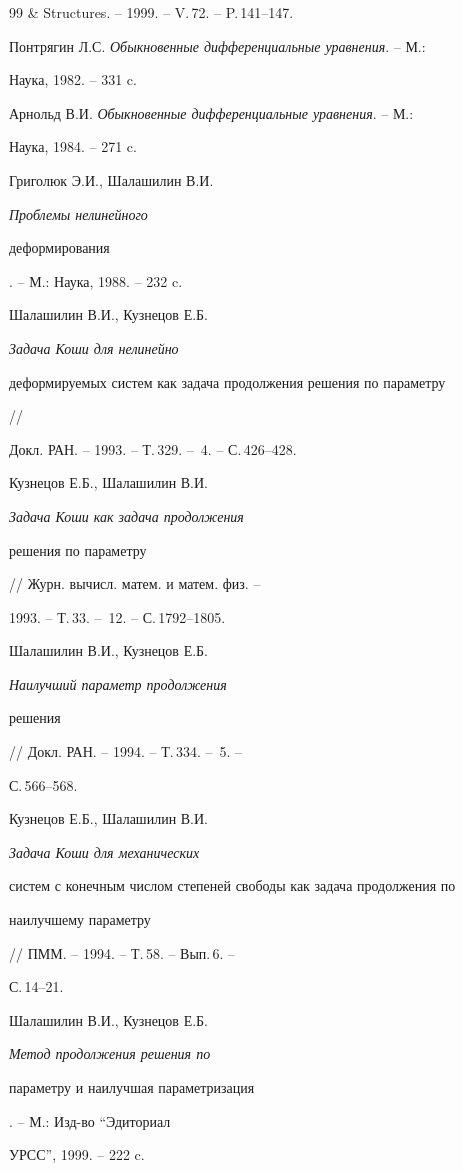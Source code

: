 \begin{thebibliography}{99}
\& Structures. -- 1999. -- V.\,72. -- P.\,141--147. 




Понтрягин Л.С. {\em Обыкновенные дифференциальные уравнения}. -- М.: 


Наука, 1982. -- 331 c. 




Арнольд В.И. {\em Обыкновенные дифференциальные уравнения}. -- М.: 


Наука, 1984. -- 271 c. 




Григолюк Э.И., Шалашилин В.И. {\em Проблемы нелинейного 


деформирования}. -- М.: Наука, 1988. -- 232 c. 




Шалашилин В.И., Кузнецов Е.Б. {\em Задача Коши для нелинейно 


деформируемых систем как задача продолжения решения по параметру} // 


Докл. РАН. -- 1993. -- Т.\,329. -- \No\,4. -- С.\,426--428. 




Кузнецов Е.Б., Шалашилин В.И. {\em Задача Коши как задача продолжения 


решения по параметру} // Журн. вычисл. матем. и матем. физ. -- 


1993. -- Т.\,33. -- \No\,12. -- С.\,1792--1805. 




Шалашилин В.И., Кузнецов Е.Б. {\em Наилучший параметр продолжения 


решения} // Докл. РАН. -- 1994. -- Т.\,334. -- \No\,5. -- 


С.\,566--568. 




Кузнецов Е.Б., Шалашилин В.И. {\em Задача Коши для механических 


систем с конечным числом степеней свободы как задача продолжения по 


наилучшему параметру} // ПММ. -- 1994. -- Т.\,58. -- Вып.\,6. -- 


С.\,14--21. 




Шалашилин В.И., Кузнецов Е.Б. {\em Метод продолжения решения по 


параметру и наилучшая параметризация}. -- М.: Изд-во ``Эдиториал 


УРСС'', 1999. -- 222 c. 



\end{thebibliography}
